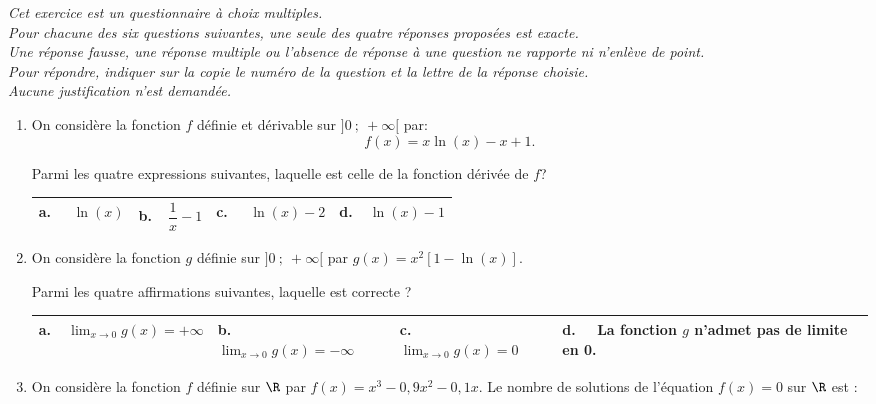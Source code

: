 \medskip

\emph{Cet exercice est un questionnaire à choix multiples. \\
Pour chacune des six questions suivantes, une seule des quatre réponses proposées est exacte.\\
Une réponse fausse, une réponse multiple ou l'absence de réponse à une question ne rapporte ni n'enlève de point.\\
Pour répondre, indiquer sur la copie le numéro de la question et la lettre de la réponse choisie.\\
Aucune justification n'est demandée.}

\medskip

\begin{enumerate}
\item On considère la fonction $f$ définie et dérivable sur $]0~;~+\infty[$ par:
\[f(x) = x \ln(x) - x + 1.\]

Parmi les quatre expressions suivantes, laquelle est celle de la fonction dérivée de $f$?

\begin{center}
\begin{tabularx}{\linewidth}{|*{4}{X|}}\hline
\textbf{a.~~} $\ln (x)$&\textbf{b.~~}$\dfrac{1}{x} - 1$&\textbf{c.~~} $\ln (x) - 2$&\textbf{d.~~}$\ln (x) - 1$\rule[-3mm]{0mm}{9mm}\\ \hline
\end{tabularx}
\end{center}

\item On considère la fonction $g$ définie sur $]0~;~+\infty[$ par $g(x) = x^2[1 - \ln (x)]$.

 Parmi les quatre affirmations suivantes, laquelle est correcte ?
 
\begin{center}
\begin{tabularx}{\linewidth}{|*{4}{X|}}\hline
\textbf{a.~~}$\displaystyle\lim_{x \to 0} g(x) = +\infty$&\textbf{b.~~} 
$\displaystyle\lim_{x \to 0} g(x) = - \infty$&\textbf{c.~~} $\displaystyle\lim_{x \to 0} g(x) = 0$&\textbf{d.~~} La fonction $g$ n'admet pas de limite en 0.\\ \hline
\end{tabularx}
\end{center}

\item On considère la fonction $f$ définie sur $\R$ par $f(x) = x^3 - 0,9x^2 -0,1x$. Le nombre de solutions de l'équation $f(x) = 0$ sur $\R$ est :


\end{enumerate}
